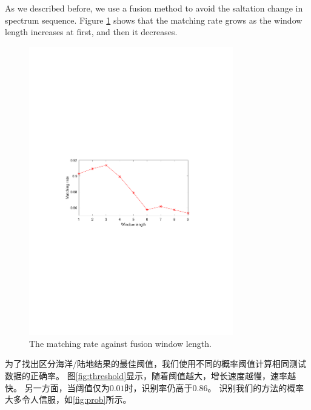 As we described before, we use a fusion method to avoid the saltation change in spectrum sequence. Figure \ref{fig:window} shows that the matching rate grows as the window length increases at first, and then it decreases.
\begin{figure}[!t]
	\centering
	\includegraphics[width=3.5in]{figures/window}
	\caption{The matching rate against fusion window length.}
	\label{fig:window}
\end{figure}
为了找出区分海洋/陆地结果的最佳阈值，我们使用不同的概率阈值计算相同测试数据的正确率。 图\ref{fig:threshold}显示，随着阈值越大，增长速度越慢，速率越快。 另一方面，当阈值仅为$0.01$时，识别率仍高于$0.86$。 识别我们的方法的概率大多令人信服，如\ref{fig:prob}所示。
